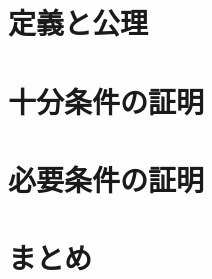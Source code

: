 \documentclass[dvipdfmx,cjk]{beamer}
\begin{document}
\section{定義と公理}
\begin{frame}
  
\end{frame}
\section{十分条件の証明}
\begin{frame}
  
\end{frame}
\section{必要条件の証明}
\begin{frame}
  
\end{frame}
\section{まとめ}
\begin{frame}
  
\end{frame}
\end{document}
